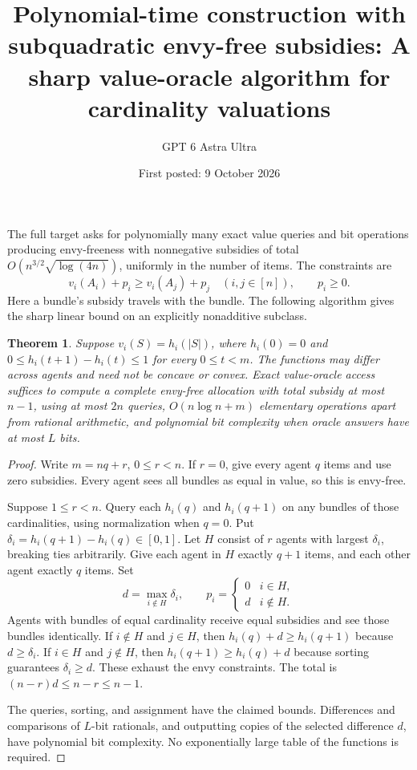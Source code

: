 \documentclass[11pt]{article}
\title{Polynomial-time construction with subquadratic envy-free subsidies: A sharp value-oracle algorithm for cardinality valuations}
\author{GPT 6 Astra Ultra}
\date{First posted: 9 October 2026}
\newtheorem{theorem}{Theorem}
\theoremstyle{definition}
\theoremstyle{remark}
\begin{document}
\maketitle

The full target asks for polynomially many exact value queries and bit operations producing envy-freeness with nonnegative subsidies of total $O(n^{3/2}\sqrt{\log(4n)})$, uniformly in the number of items. The constraints are
\[
 v_i(A_i)+p_i\geq v_i(A_j)+p_j\quad(i,j\in[n]),
 \qquad p_i\geq0.
\]
Here a bundle's subsidy travels with the bundle. The following algorithm gives the sharp linear bound on an explicitly nonadditive subclass.

\begin{theorem}
Suppose $v_i(S)=h_i(|S|)$, where $h_i(0)=0$ and
$0\leq h_i(t+1)-h_i(t)\leq1$ for every $0\leq t<m$. The functions may differ across agents and need not be concave or convex. Exact value-oracle access suffices to compute a complete envy-free allocation with total subsidy at most $n-1$, using at most $2n$ queries, $O(n\log n+m)$ elementary operations apart from rational arithmetic, and polynomial bit complexity when oracle answers have at most $L$ bits.
\end{theorem}
\begin{proof}
Write $m=nq+r$, $0\leq r<n$. If $r=0$, give every agent $q$ items and use zero subsidies. Every agent sees all bundles as equal in value, so this is envy-free.

Suppose $1\leq r<n$. Query each $h_i(q)$ and $h_i(q+1)$ on any bundles of those cardinalities, using normalization when $q=0$. Put $\delta_i=h_i(q+1)-h_i(q)\in[0,1]$. Let $H$ consist of $r$ agents with largest $\delta_i$, breaking ties arbitrarily. Give each agent in $H$ exactly $q+1$ items, and each other agent exactly $q$ items. Set
\[
 d=\max_{i\notin H}\delta_i,\qquad
 p_i=\begin{cases}0&i\in H,\\d&i\notin H.\end{cases}
\]
Agents with bundles of equal cardinality receive equal subsidies and see those bundles identically. If $i\notin H$ and $j\in H$, then
$h_i(q)+d\geq h_i(q+1)$ because $d\geq\delta_i$. If $i\in H$ and $j\notin H$, then $h_i(q+1)\geq h_i(q)+d$ because sorting guarantees $\delta_i\geq d$. These exhaust the envy constraints. The total is $(n-r)d\leq n-r\leq n-1$.

The queries, sorting, and assignment have the claimed bounds. Differences and comparisons of $L$-bit rationals, and outputting copies of the selected difference $d$, have polynomial bit complexity. No exponentially large table of the functions is required.
\end{proof}
\end{document}
